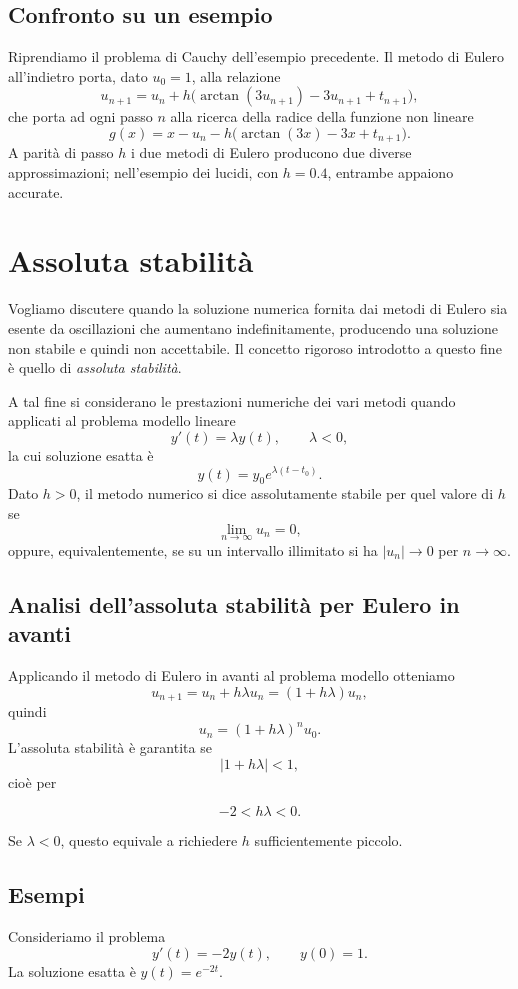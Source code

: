 \documentclass[11pt,a4paper]{report}
\begin{document}
\subsection{Confronto su un esempio}
Riprendiamo il problema di Cauchy dell'esempio precedente. Il metodo di Eulero all'indietro porta, dato $u_0=1$, alla relazione
\[
 u_{n+1}=u_n+h\bigl(\arctan(3u_{n+1})-3u_{n+1}+t_{n+1}\bigr),
\]
che porta ad ogni passo $n$ alla ricerca della radice della funzione non lineare
\[
 g(x)=x-u_n-h\bigl(\arctan(3x)-3x+t_{n+1}\bigr).
\]
A parit\`a di passo $h$ i due metodi di Eulero producono due diverse approssimazioni; nell'esempio dei lucidi, con $h=0.4$, entrambe appaiono accurate.


\section{Assoluta stabilit\`a}
Vogliamo discutere quando la soluzione numerica fornita dai metodi di Eulero sia esente da oscillazioni che aumentano indefinitamente, producendo una soluzione non stabile e quindi non accettabile. Il concetto rigoroso introdotto a questo fine \`e quello di \emph{assoluta stabilit\`a}.

A tal fine si considerano le prestazioni numeriche dei vari metodi quando applicati al problema modello lineare
\[
 y'(t)=\lambda y(t),
\qquad \lambda<0,
\]
la cui soluzione esatta \`e
\[
 y(t)=y_0e^{\lambda(t-t_0)}.
\]
Dato $h>0$, il metodo numerico si dice assolutamente stabile per quel valore di $h$ se
\[
 \lim_{n\to\infty}u_n=0,
\]
oppure, equivalentemente, se su un intervallo illimitato si ha $|u_n|\to 0$ per $n\to\infty$.

\subsection{Analisi dell'assoluta stabilit\`a per Eulero in avanti}
Applicando il metodo di Eulero in avanti al problema modello otteniamo
\[
 u_{n+1}=u_n+h\lambda u_n=(1+h\lambda)u_n,
\]
quindi
\[
 u_n=(1+h\lambda)^n u_0.
\]
L'assoluta stabilit\`a \`e garantita se
\[
 |1+h\lambda|<1,
\]
cio\`e per
\begin{formulaBox}
\[
 -2<h\lambda<0.
\]
\end{formulaBox}
Se $\lambda<0$, questo equivale a richiedere $h$ sufficientemente piccolo.

\subsection{Esempi}
Consideriamo il problema
\[
 y'(t)=-2y(t), \qquad y(0)=1.
\]
La soluzione esatta \`e $y(t)=e^{-2t}$.
\end{document}
